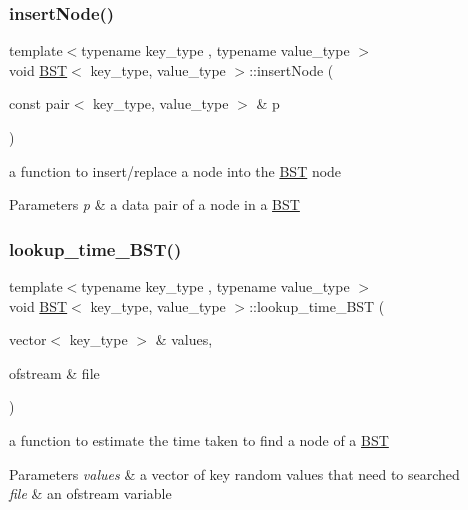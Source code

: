 \subsubsection{\texorpdfstring{insertNode()}{insertNode()}}
{\footnotesize\ttfamily template$<$typename key\+\_\+type , typename value\+\_\+type $>$ \\
void \mbox{\hyperlink{class_b_s_t}{B\+ST}}$<$ key\+\_\+type, value\+\_\+type $>$\+::insert\+Node (\begin{DoxyParamCaption}\item[{const pair$<$ key\+\_\+type, value\+\_\+type $>$ \&}]{p }\end{DoxyParamCaption})}

a function to insert/replace a node into the \mbox{\hyperlink{class_b_s_t}{B\+ST}} node 
\begin{DoxyParams}{Parameters}
{\em p} & a data pair of a node in a \mbox{\hyperlink{class_b_s_t}{B\+ST}} \\
\hline
\end{DoxyParams}
\mbox{\label{class_b_s_t_a24d4502a47d3eb6d3ad9a93c7106afb1}} 
\subsubsection{\texorpdfstring{lookup\_time\_BST()}{lookup\_time\_BST()}}
{\footnotesize\ttfamily template$<$typename key\+\_\+type , typename value\+\_\+type $>$ \\
void \mbox{\hyperlink{class_b_s_t}{B\+ST}}$<$ key\+\_\+type, value\+\_\+type $>$\+::lookup\+\_\+time\+\_\+\+B\+ST (\begin{DoxyParamCaption}\item[{vector$<$ key\+\_\+type $>$ \&}]{values,  }\item[{ofstream \&}]{file }\end{DoxyParamCaption})}

a function to estimate the time taken to find a node of a \mbox{\hyperlink{class_b_s_t}{B\+ST}} 
\begin{DoxyParams}{Parameters}
{\em values} & a vector of key random values that need to searched \\
\hline
{\em file} & an ofstream variable \\
\hline
\end{DoxyParams}
\mbox{\label{class_b_s_t_a649df72e94b04a35975b0b3620777208}} 
